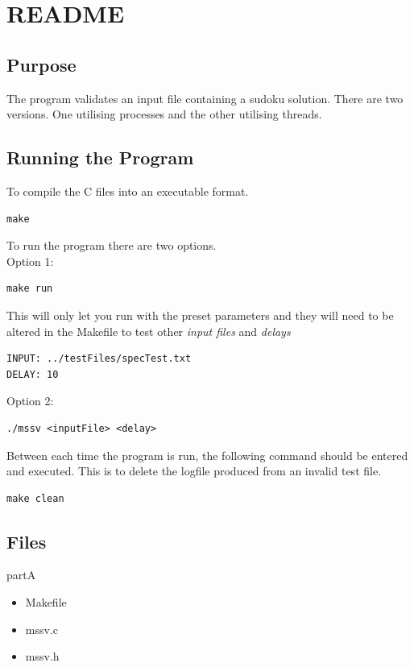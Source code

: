 \documentclass[]{article}
\begin{document}
\section{README}



\subsection{Purpose}
The program validates an input file containing a sudoku solution. There are two versions. One utilising processes and the other utilising threads.

\subsection{Running the Program}
To compile the C files into an executable format.

\begin{lstlisting}[style=code]
	make
\end{lstlisting}

To run the program there are two options.\\

Option 1:


\begin{lstlisting}[style=code]
	make run 
\end{lstlisting}
\vspace{0.5cm}
This will only let you run with the preset parameters and they will need to be altered in the Makefile to test other \textit{input files} and \textit{delays} 


\begin{lstlisting}[style=code]
INPUT: ../testFiles/specTest.txt
DELAY: 10
\end{lstlisting}
\vspace{0.5cm}
Option 2: 
\begin{lstlisting}[style=code]
./mssv <inputFile> <delay>
\end{lstlisting}

\vspace{0.5cm}
Between each time the program is run, the following command should be entered and executed. This is to delete the logfile produced from an invalid test file.

\begin{lstlisting}[style=code]
	make clean
\end{lstlisting}

\subsection{Files}
partA
\begin{itemize}
	\item Makefile
	\item mssv.c
	\item mssv.h
\end{itemize}
\end{document}
